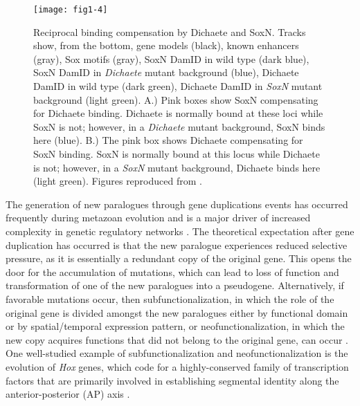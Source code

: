 \begin{figure}
\centering
\texttt{[image: fig1-4]}
\caption[Reciprocal binding compensation by Dichaete and SoxN]{Reciprocal binding compensation by Dichaete and SoxN. Tracks show, from the bottom, gene models (black), known enhancers (gray), Sox motifs (gray), SoxN DamID in wild type (dark blue), SoxN DamID in \emph{Dichaete} mutant background (blue), Dichaete DamID in wild type (dark green), Dichaete DamID in \emph{SoxN} mutant background (light green). A.) Pink boxes show SoxN compensating for Dichaete binding. Dichaete is normally bound at these loci while SoxN is not; however, in a \emph{Dichaete} mutant background, SoxN binds here (blue). B.) The pink box shows Dichaete compensating for SoxN binding. SoxN is normally bound at this locus while Dichaete is not; however, in a \emph{SoxN} mutant background, Dichaete binds here (light green). Figures reproduced from \citet{ferrero_soxneuro_2014}.}
\label{Figure 1.4}
\end{figure}

The generation of new paralogues through gene duplications events has occurred frequently during metazoan evolution and is a major driver of increased complexity in genetic regulatory networks \citep{larroux_genesis_2008}. The theoretical expectation after gene duplication has occurred is that the new paralogue experiences reduced selective pressure, as it is essentially a redundant copy of the original gene. This opens the door for the accumulation of mutations, which can lead to loss of function and transformation of one of the new paralogues into a pseudogene. Alternatively, if favorable mutations occur, then subfunctionalization, in which the role of the original gene is divided amongst the new paralogues either by functional domain or by spatial/temporal expression pattern, or neofunctionalization, in which the new copy acquires functions that did not belong to the original gene, can occur \citep{force_preservation_1999,lynch_evolutionary_2000}. One well-studied example of subfunctionalization and neofunctionalization is the evolution of \emph{Hox} genes, which code for a highly-conserved family of transcription factors that are primarily involved in establishing segmental identity along the anterior-posterior (AP) axis \citep{kappen_evolution_1993}.

